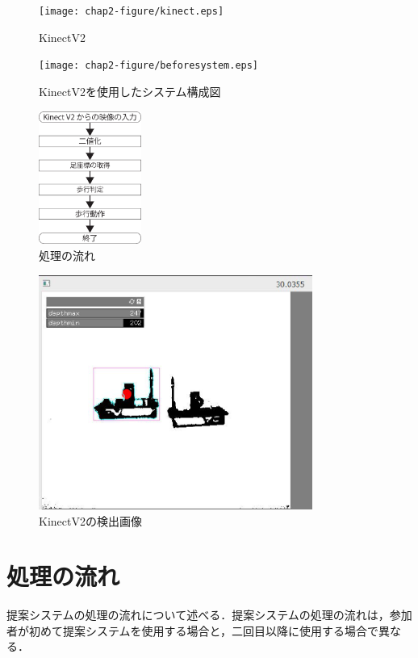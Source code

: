 \begin{figure}[tbp]
	\centering
			\texttt{[image: chap2-figure/kinect.eps]}
	\caption{KinectV2}
	\label{fig:kinect}
\end{figure}

\begin{figure}[tbp]
	\centering
			\texttt{[image: chap2-figure/beforesystem.eps]}
	\caption{KinectV2を使用したシステム構成図}
	\label{fig:beforesystemarc}
\end{figure}

\begin{figure}[tbp]
	\centering
			\includegraphics[width=0.3\textwidth]{chap2-figure/katagiri1.eps}
	\caption{処理の流れ}
	\label{fig:片桐1}
\end{figure}

\begin{figure}[tbp]
	\centering
			\includegraphics[width=0.8\textwidth]{chap2-figure/kinectsystem.eps}
	\caption{KinectV2の検出画像}
	\label{fig:kinectsystemarc}
\end{figure}
\fi

\section{処理の流れ}
提案システムの処理の流れについて述べる．提案システムの処理の流れは，参加者が初めて提案システムを使用する場合と，二回目以降に使用する場合で異なる．


